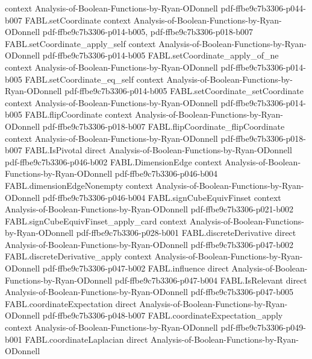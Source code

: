 \begin{theorem}
  {context}
  {Analysis-of-Boolean-Functions-by-Ryan-ODonnell}
  {pdf-ffbe9c7b3306-p044-b007}
\proofstep
  {FABL.setCoordinate}
  {context}
  {Analysis-of-Boolean-Functions-by-Ryan-ODonnell}
  {pdf-ffbe9c7b3306-p014-b005,
    pdf-ffbe9c7b3306-p018-b007}
\proofstep
  {FABL.setCoordinate_apply_self}
  {context}
  {Analysis-of-Boolean-Functions-by-Ryan-ODonnell}
  {pdf-ffbe9c7b3306-p014-b005}
\proofstep
  {FABL.setCoordinate_apply_of_ne}
  {context}
  {Analysis-of-Boolean-Functions-by-Ryan-ODonnell}
  {pdf-ffbe9c7b3306-p014-b005}
\proofstep
  {FABL.setCoordinate_eq_self}
  {context}
  {Analysis-of-Boolean-Functions-by-Ryan-ODonnell}
  {pdf-ffbe9c7b3306-p014-b005}
\proofstep
  {FABL.setCoordinate_setCoordinate}
  {context}
  {Analysis-of-Boolean-Functions-by-Ryan-ODonnell}
  {pdf-ffbe9c7b3306-p014-b005}
\proofstep
  {FABL.flipCoordinate}
  {context}
  {Analysis-of-Boolean-Functions-by-Ryan-ODonnell}
  {pdf-ffbe9c7b3306-p018-b007}
\proofstep
  {FABL.flipCoordinate_flipCoordinate}
  {context}
  {Analysis-of-Boolean-Functions-by-Ryan-ODonnell}
  {pdf-ffbe9c7b3306-p018-b007}
\proofstep
  {FABL.IsPivotal}
  {direct}
  {Analysis-of-Boolean-Functions-by-Ryan-ODonnell}
  {pdf-ffbe9c7b3306-p046-b002}
\proofstep
  {FABL.DimensionEdge}
  {context}
  {Analysis-of-Boolean-Functions-by-Ryan-ODonnell}
  {pdf-ffbe9c7b3306-p046-b004}
\proofstep
  {FABL.dimensionEdgeNonempty}
  {context}
  {Analysis-of-Boolean-Functions-by-Ryan-ODonnell}
  {pdf-ffbe9c7b3306-p046-b004}
\proofstep
  {FABL.signCubeEquivFinset}
  {context}
  {Analysis-of-Boolean-Functions-by-Ryan-ODonnell}
  {pdf-ffbe9c7b3306-p021-b002}
\proofstep
  {FABL.signCubeEquivFinset_apply_card}
  {context}
  {Analysis-of-Boolean-Functions-by-Ryan-ODonnell}
  {pdf-ffbe9c7b3306-p028-b001}
\proofstep
  {FABL.discreteDerivative}
  {direct}
  {Analysis-of-Boolean-Functions-by-Ryan-ODonnell}
  {pdf-ffbe9c7b3306-p047-b002}
\proofstep
  {FABL.discreteDerivative_apply}
  {context}
  {Analysis-of-Boolean-Functions-by-Ryan-ODonnell}
  {pdf-ffbe9c7b3306-p047-b002}
\proofstep
  {FABL.influence}
  {direct}
  {Analysis-of-Boolean-Functions-by-Ryan-ODonnell}
  {pdf-ffbe9c7b3306-p047-b004}
\proofstep
  {FABL.IsRelevant}
  {direct}
  {Analysis-of-Boolean-Functions-by-Ryan-ODonnell}
  {pdf-ffbe9c7b3306-p047-b005}
\proofstep
  {FABL.coordinateExpectation}
  {direct}
  {Analysis-of-Boolean-Functions-by-Ryan-ODonnell}
  {pdf-ffbe9c7b3306-p048-b007}
\proofstep
  {FABL.coordinateExpectation_apply}
  {context}
  {Analysis-of-Boolean-Functions-by-Ryan-ODonnell}
  {pdf-ffbe9c7b3306-p049-b001}
\proofstep
  {FABL.coordinateLaplacian}
  {direct}
  {Analysis-of-Boolean-Functions-by-Ryan-ODonnell}

\end{theorem}
